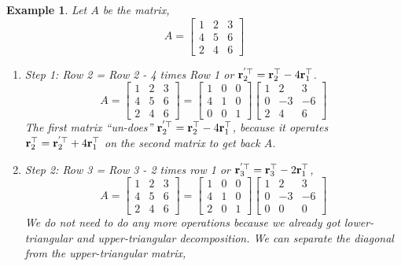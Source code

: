 \documentclass{article}
\newtheorem{example}{Example}
\begin{document}
\begin{example}
  Let $A$ be   the  matrix,
  \[
    A   =  \begin{bmatrix}
      1 &   2  &  3  \\
      4 & 5 &   6 \\
      2 & 4 &   6
    \end{bmatrix}
    \]
\begin{enumerate}
  \item  Step  1: Row 2 = Row  2 -  4 times Row  1  or $\mathbf{r}_2^{'\top} =
    \mathbf{r}_2^\top  -  4 \mathbf{r}_1^\top$.
    \[
      A   =  \begin{bmatrix}
        1 &   2  &  3  \\
        4 & 5 &   6 \\
        2 & 4 &   6
      \end{bmatrix}
      =   \begin{bmatrix}
        1 & 0  &  0 \\
        4  &  1 &  0  \\
        0  &  0 &  1
        \end{bmatrix}\begin{bmatrix}
        1 & 2 &  3  \\
        0 & -3 &  -6 \\
        2 & 4 &  6
      \end{bmatrix}
    \]
    The  first  matrix ``un-does'' $\mathbf{r}_2^{'\top} =
    \mathbf{r}_2^\top  -  4 \mathbf{r}_1^\top$, because  it  operates  $\mathbf{r}_2^{\top} =
    \mathbf{r}_2^{'\top}  +  4 \mathbf{r}_1^\top$    on  the   second  matrix  to get back $A$.
  \item Step 2: Row  3  =   Row  3 - 2  times row 1  or   $\mathbf{r}_3^{'\top} =
    \mathbf{r}_3^\top  -  2 \mathbf{r}_1^\top$,
    \[
      A   =  \begin{bmatrix}
        1 &   2  &  3  \\
        4 & 5 &   6 \\
        2 & 4 &   6
      \end{bmatrix}
      =   \begin{bmatrix}
        1 & 0  &  0 \\
        4  &  1 &  0  \\
        2  &  0 &  1
      \end{bmatrix}\begin{bmatrix}
        1 & 2 &  3  \\
        0 & -3 &  -6 \\
        0 & 0 &  0
      \end{bmatrix}
    \]
    We do   not need to do any more  operations because we already got
    lower-triangular  and  upper-triangular   decomposition.  We can separate
    the diagonal from the  upper-triangular  matrix,


\end{enumerate}
\end{example}
\end{document}
